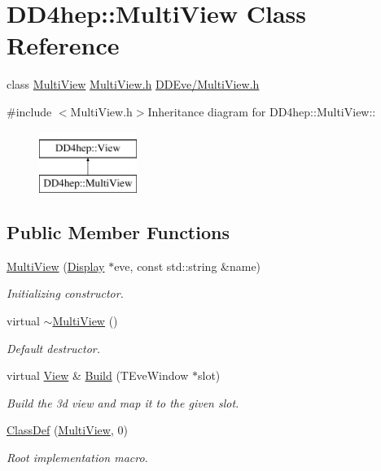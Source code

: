 \hypertarget{class_d_d4hep_1_1_multi_view}{
\section{DD4hep::MultiView Class Reference}
\label{class_d_d4hep_1_1_multi_view}
}


class \hyperlink{class_d_d4hep_1_1_multi_view}{MultiView} \hyperlink{_multi_view_8h}{MultiView.h} \hyperlink{_multi_view_8h}{DDEve/MultiView.h}  


{\ttfamily \#include $<$MultiView.h$>$}Inheritance diagram for DD4hep::MultiView::\begin{figure}[H]
\begin{center}
\leavevmode
\includegraphics[height=2cm]{class_d_d4hep_1_1_multi_view}
\end{center}
\end{figure}
\subsection*{Public Member Functions}
\begin{DoxyCompactItemize}
\item 
\hyperlink{class_d_d4hep_1_1_multi_view_a74b3e2c9a7bb1fb4da01630922325a34}{MultiView} (\hyperlink{class_d_d4hep_1_1_display}{Display} $\ast$eve, const std::string \&name)
\begin{DoxyCompactList}\small\item\em Initializing constructor. \item\end{DoxyCompactList}\item 
virtual \hyperlink{class_d_d4hep_1_1_multi_view_aa9f47e52d36461b82c352b9cb3949ada}{$\sim$MultiView} ()
\begin{DoxyCompactList}\small\item\em Default destructor. \item\end{DoxyCompactList}\item 
virtual \hyperlink{class_d_d4hep_1_1_view}{View} \& \hyperlink{class_d_d4hep_1_1_multi_view_a979d39b6332fa3a647a12d982a4f74fb}{Build} (TEveWindow $\ast$slot)
\begin{DoxyCompactList}\small\item\em Build the 3d view and map it to the given slot. \item\end{DoxyCompactList}\item 
\hyperlink{class_d_d4hep_1_1_multi_view_ae1b4bd4c3527dfe174acada259e6514c}{ClassDef} (\hyperlink{class_d_d4hep_1_1_multi_view}{MultiView}, 0)
\begin{DoxyCompactList}\small\item\em Root implementation macro. \item\end{DoxyCompactList}\end{DoxyCompactItemize}


